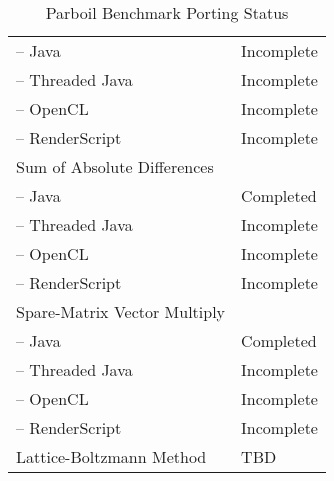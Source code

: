 \begin{table}[h]
\begin{tabular}{ | l | p{2cm} |}
    \hspace{0.5cm}-- Java & Incomplete \\
    \hspace{0.5cm}-- Threaded Java & Incomplete \\
    \hspace{0.5cm}-- OpenCL & Incomplete \\
    \hspace{0.5cm}-- RenderScript & Incomplete \\ \hline
    Sum of Absolute Differences & \\
    \hspace{0.5cm}-- Java & Completed \\
    \hspace{0.5cm}-- Threaded Java & Incomplete \\
    \hspace{0.5cm}-- OpenCL & Incomplete \\
    \hspace{0.5cm}-- RenderScript & Incomplete \\ \hline
    Spare-Matrix Vector Multiply & \\
    \hspace{0.5cm}-- Java & Completed \\
    \hspace{0.5cm}-- Threaded Java & Incomplete \\
    \hspace{0.5cm}-- OpenCL & Incomplete \\
    \hspace{0.5cm}-- RenderScript & Incomplete \\ \hline
    Lattice-Boltzmann Method & TBD \\ \hline
    \hline
\end{tabular}
\caption{Parboil Benchmark Porting Status}
\label{table:parboil}
\end{table}

